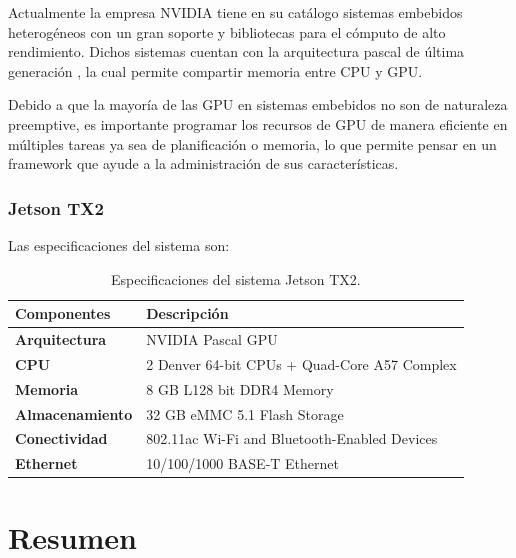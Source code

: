     Actualmente la empresa NVIDIA tiene en su catálogo sistemas embebidos heterogéneos con un gran soporte y bibliotecas para el cómputo de alto rendimiento. Dichos sistemas cuentan con la arquitectura pascal de última generación \cite{GPUArt}, la cual permite compartir memoria entre CPU y GPU.

   

    Debido a que la mayoría de las GPU en sistemas embebidos no son de naturaleza preemptive, es importante programar los recursos de GPU de manera eficiente en múltiples tareas \cite{TX2I} ya sea de planificación o memoria, lo que permite pensar en un framework que ayude a la administración de sus características. 

 \subsubsection{Jetson TX2}
    Las especificaciones del sistema son:

    \begin{table}[h!]
      \begin{center}
            \scriptsize
        \begin{tabular}{|m{3.5cm}|m{6.5cm}|}
         \hline
        \cellcolor{lightgray}\textbf{Componentes} & \cellcolor{lightgray} \textbf{Descripción}\\ 
         \hline
         \textbf{Arquitectura} & NVIDIA Pascal GPU\\
         \hline
         \textbf{CPU} & 2 Denver 64-bit CPUs + Quad-Core A57 Complex\\
         \hline
         \textbf{Memoria} & 8 GB L128 bit DDR4 Memory\\
          \hline
    	\textbf{Almacenamiento} & 32 GB eMMC 5.1 Flash Storage\\
         \hline
    	\textbf{Conectividad} & 802.11ac Wi-Fi and Bluetooth-Enabled Devices\\
         \hline
   	 \textbf{Ethernet} &10/100/1000 BASE-T Ethernet\\
         \hline
        \end{tabular}
        \caption{Especificaciones del sistema Jetson TX2\cite{jtx2dk}.}
        \label{tab:table1}
      \end{center}
    \end{table}
   
    \section{Resumen}




